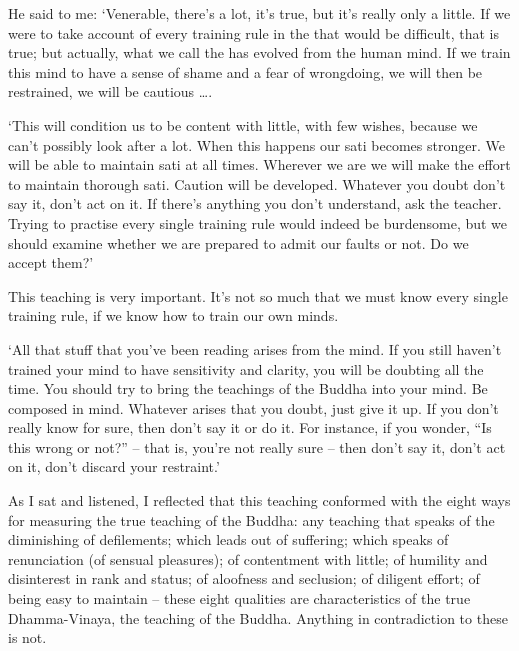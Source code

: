 He said to me: `Venerable, there's a lot, it's true, but it's really only a little. If we were to take account of every training rule in the  that would be difficult, that is true; but actually, what we call the  has evolved from the human mind. If we train this mind to have a sense of shame and a fear of wrongdoing, we will then be restrained, we will be cautious \ldots{}.

`This will condition us to be content with little, with few wishes, because we can't possibly look after a lot. When this happens our sati becomes stronger. We will be able to maintain sati at all times. Wherever we are we will make the effort to maintain thorough sati. Caution will be developed. Whatever you doubt don't say it, don't act on it. If there's anything you don't understand, ask the teacher. Trying to practise every single training rule would indeed be burdensome, but we should examine whether we are prepared to admit our faults or not. Do we accept them?'

This teaching is very important. It's not so much that we must know every single training rule, if we know how to train our own minds.

`All that stuff that you've been reading arises from the mind. If you still haven't trained your mind to have sensitivity and clarity, you will be doubting all the time. You should try to bring the teachings of the Buddha into your mind. Be composed in mind. Whatever arises that you doubt, just give it up. If you don't really know for sure, then don't say it or do it. For instance, if you wonder, ``Is this wrong or not?'' -- that is, you're not really sure -- then don't say it, don't act on it, don't discard your restraint.'

As I sat and listened, I reflected that this teaching conformed with the eight ways for measuring the true teaching of the Buddha: any teaching that speaks of the diminishing of defilements; which leads out of suffering; which speaks of renunciation (of sensual pleasures); of contentment with little; of humility and disinterest in rank and status; of aloofness and seclusion; of diligent effort; of being easy to maintain -- these eight qualities are characteristics of the true Dhamma-Vinaya, the teaching of the Buddha. Anything in contradiction to these is not.

